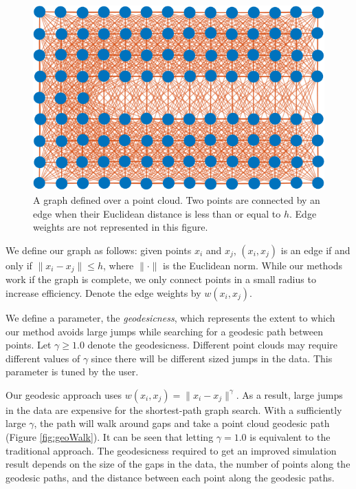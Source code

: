 \documentclass[11pt,a4paper, final, twoside]{article}
\theoremstyle{proposition}
\theoremstyle{definition}
\theoremstyle{remark}
\numberwithin{equation}{section}
\begin{document}
\begin{figure}[h]
\centering
\includegraphics{pointGraph.png}
\caption{A graph defined over a point cloud. Two points are connected by an edge when their Euclidean distance is less than or equal to $h$. Edge weights are not represented in this figure.}
\label{fig:graph}
\end{figure}

We define our graph as follows: given points $x_i$ and $x_j$, $(x_i, x_j)$ is an edge if and only if $\|x_i - x_j\| \leq h$, where $\|\cdot\|$ is the Euclidean norm. While our methods work if the graph is complete, we only connect points in a small radius to increase efficiency. Denote the edge weights by $w(x_i,x_j)$.

We define a parameter, the \textit{geodesicness}, which represents the extent to which our method avoids large jumps while searching for a geodesic path between points. Let $\gamma \geq 1.0$ denote the geodesicness. Different point clouds may require different values of $\gamma$ since there will be different sized jumps in the data. This parameter is tuned by the user.

Our geodesic approach uses $w(x_i, x_j) = \|x_i - x_j\|^\gamma$. As a result, large jumps in the data are expensive for the shortest-path graph search. With a sufficiently large $\gamma$, the path will walk around gaps and take a point cloud geodesic path (Figure \ref{fig:geoWalk}). It can be seen that letting $\gamma = 1.0$ is equivalent to the traditional approach. The geodesicness required to get an improved simulation result depends on the size of the gaps in the data, the number of points along the geodesic paths, and the distance between each point along the geodesic paths.
\end{document}
